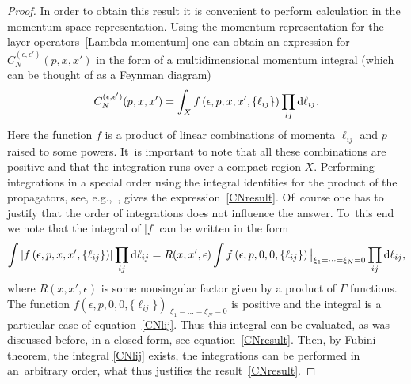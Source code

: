 \begin{proof}
In order to obtain this result it is convenient to perform calculation in the momentum space representation. Using the momentum
representation for the layer operators~\eqref{Lambda-momentum} one can obtain an expression for $C_N^{( \epsilon, \epsilon')}(p, x, x')$ in
the form of a multidimensional momentum integral (which can be thought of as a Feynman diagram)
\begin{gather}\label{CNlij}
C_N^{( \epsilon, \epsilon')}(p,x, x')
 = \int_X f\left( \epsilon,p, x, x',\{\ell_{ij}\}\right) \prod_{ij}{\rm d}\ell_{ij}.
\end{gather}
Here the function $f$ is a product of linear combinations of momenta $\ell_{ij}$ and $p$ raised to some powers. It~is important to note
that all these combinations are positive and that the integration runs over a compact region $X$. Performing integrations in a special
order using the integral identities for the product of the propagators, see,
e.g.,~\cite{Derkachov:2003qb,Derkachov:2002tf,DMspinchainandSL2RGustafson}, gives the expression~\eqref{CNresult}. Of~course one
has to justify that the order of integrations does not influence the answer. To~this end we note that the integral of $|f|$ can be written
in the form
\begin{gather*}%
\int \left|f\left( \epsilon,p, x, x',\{\ell_{ij}\}\right)\right| \prod_{ij}{\rm d}\ell_{ij} =
R( x, x',\epsilon)\int f\left( \epsilon,p, 0, 0,\{\ell_{ij}\}\right)\big|_{\xi_1=\dots=\xi_N=0} \prod_{ij}{\rm d}\ell_{ij},
\end{gather*}
where $R( x, x',\epsilon)$ is some nonsingular factor given by a product of $\Gamma$ functions. The function $f\left(\epsilon,p, 0, 0,\{\ell_{ij}\}\right)\big|_{\xi_1=\dots=\xi_N=0}$ is positive and the integral is a particular case of equation~\eqref{CNlij}. Thus this integral can
be evaluated, as was discussed before, in a closed form, see equation~\eqref{CNresult}. Then, by Fubini theorem, the integral \eqref{CNlij}
exists, the integrations can be performed in an~arbi\-t\-rary order, what thus justifies the result~\eqref{CNresult}.




\end{proof}
